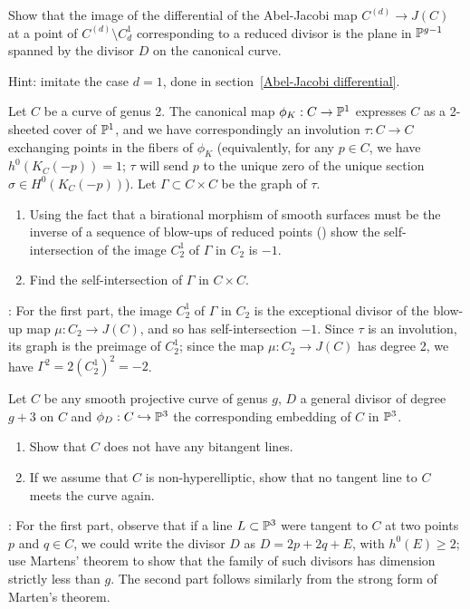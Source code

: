 \begin{exercise} \label{comparison with geometric RR}
Show that the image of the differential of the Abel-Jacobi map $C^{(d)} \to J(C)$ at a point of $C^{(d)} \setminus C^1_d$  corresponding to a reduced divisor is  the plane in $\PP^{g-1}$ spanned by the divisor $D$ on the canonical curve.

Hint: imitate the case $d=1$, done in section~\ref{Abel-Jacobi differential}.
\end{exercise}

\begin{exercise}\label{blow-up of $J(C)$ at a point}
Let $C$ be a curve of genus 2. The canonical map $\phi_K : C \to \PP^1$ expresses $C$ as a 2-sheeted cover of $\PP^1$, and we have correspondingly an involution $\tau : C \to C$ exchanging points in the fibers of $\phi_K$ (equivalently, for any $p \in C$, we have $h^0(K_C(-p)) = 1$; $\tau$ will send $p$ to the unique zero of the unique section $\sigma \in H^0(K_C(-p))$). Let $\Gamma \subset C \times C$ be the graph of $\tau$.
\begin{enumerate}
\item Using the fact that a birational morphism of smooth surfaces must be the inverse of a sequence of blow-ups of reduced points (\cite[V.??]{H}) show the self-intersection of the image $C^1_2$ of $\Gamma$ in $C_2$ is $-1$.
\item Find the self-intersection of $\Gamma$ in $C \times C$.
\end{enumerate}

: For the first part, the image $C^1_2$  of $\Gamma$ in $C_2$ is the exceptional divisor of the blow-up map $\mu : C_2 \to J(C)$, and so has self-intersection $-1$. Since $\tau$ is an involution, its graph is the preimage of $C^1_2$; since the map $\mu : C_2 \to J(C)$ has degree 2, we have $\Gamma^2 = 2(C^1_2)^2 = -2$.
\end{exercise}

\begin{exercise}
Let $C$ be any smooth projective curve of genus $g$, $D$ a general divisor of degree $g+3$ on $C$ and $\phi_D : C \hookrightarrow \PP^3$ the corresponding embedding of $C$ in $\PP^3$.
\begin{enumerate}
\item Show that $C$ does not have any bitangent lines.
\item If we assume that $C$ is non-hyperelliptic, show that no tangent line to $C$ meets the curve again.
\end{enumerate}
\end{exercise}

: For the first part, observe that if a line $L \subset \PP^3$ were tangent to $C$ at two points $p$ and $q \in C$, we could write the divisor $D$ as $D = 2p + 2q + E$, with $h^0(E) \geq 2$; use Martens' theorem to show that the family of such divisors has dimension strictly less than $g$. 
The second part follows similarly from the strong form of Marten's theorem.
